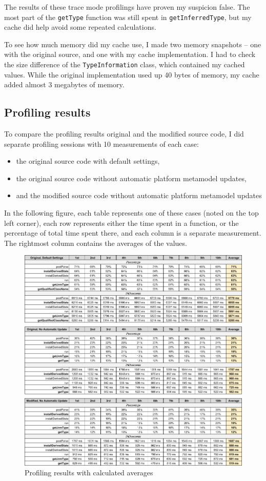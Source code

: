 \documentclass[11pt,a4paper,oneside]{report}
\begin{document}
The results of these trace mode profilings have proven my suspicion false. The
most part of the \texttt{getType} function was still spent in
\texttt{getInferredType}, but my cache did help avoid some repeated
calculations.

To see how much memory did my cache use, I made two memory snapshots -- one with
the original source, and one with my cache implementation. I had to check the
size difference of the \texttt{TypeInformation} class, which contained my cached
values. While the original implementation used up 40 bytes of memory, my cache
added almost 3 megabytes of memory.

\subsection{Profiling results}
To compare the profiling results original and the modified source code, I did
separate profiling sessions with 10 measurements of each case:
\begin{itemize}
    \item{the original source code with default settings,}
    \item{the original source code without automatic platform metamodel updates,}
    \item{and the modified source code without automatic platform metamodel updates}
\end{itemize}

In the following figure, each table represents one of these cases (noted on the
top left corner), each row represents either the time spent in a function, or
the percentage of total time spent there, and each column is a separate
measurement. The rightmost column contains the averages of the values.

\begin{figure}[ht]
\centering
\includegraphics[width=150mm,keepaspectratio]{figures/measurements.png}
\caption{Profiling results with calculated averages}
\label{fig:profiling-measurements}
\end{figure}
\end{document}
